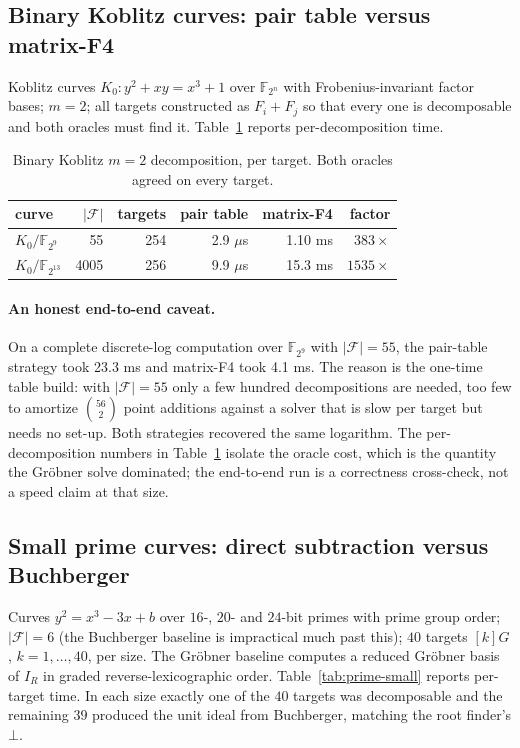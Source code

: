 \documentclass[10pt,a4paper]{article}
\theoremstyle{remark}
\newcommand{\FF}{\mathbb{F}}
\newcommand{\Fb}{\mathcal{F}}
\newcommand{\abs}[1]{\lvert #1 \rvert}
\begin{document}
\subsection{Binary Koblitz curves: pair table versus matrix-F4}
\label{sec:exp-binary}

Koblitz curves $K_0 : y^2 + xy = x^3 + 1$ over $\FF_{2^n}$ with
Frobenius-invariant factor bases; $m = 2$; all targets constructed as
$F_i + F_j$ so that every one is decomposable and both oracles must find
it. Table~\ref{tab:binary} reports per-decomposition time.

\begin{table}[h]
\centering
\caption{Binary Koblitz $m=2$ decomposition, per target. Both oracles
agreed on every target.}
\label{tab:binary}
\begin{tabular}{@{}lrrrrr@{}}
\toprule
curve & $\abs{\Fb}$ & targets & pair table & matrix-F4 & factor \\
\midrule
$K_0/\FF_{2^{9}}$  & 55   & 254 & 2.9 $\mu$s  & 1.10 ms & $383\times$ \\
$K_0/\FF_{2^{13}}$ & 4005 & 256 & 9.9 $\mu$s  & 15.3 ms & $1535\times$ \\
\bottomrule
\end{tabular}
\end{table}

\paragraph{An honest end-to-end caveat.} On a complete discrete-log
computation over $\FF_{2^9}$ with $\abs{\Fb} = 55$, the pair-table
strategy took 23.3 ms and matrix-F4 took 4.1 ms. The reason is the
one-time table build: with $\abs{\Fb} = 55$ only a few hundred
decompositions are needed, too few to amortize $\binom{56}{2}$ point
additions against a solver that is slow per target but needs no set-up.
Both strategies recovered the same logarithm. The per-decomposition
numbers in Table~\ref{tab:binary} isolate the oracle cost, which is the
quantity the Gr\"obner solve dominated; the end-to-end run is a
correctness cross-check, not a speed claim at that size.

\subsection{Small prime curves: direct subtraction versus Buchberger}
\label{sec:exp-prime-small}

Curves $y^2 = x^3 - 3x + b$ over $16$-, $20$- and $24$-bit primes with
prime group order; $\abs{\Fb} = 6$ (the Buchberger baseline is
impractical much past this); $40$ targets $[k]G$, $k = 1,\ldots,40$,
per size. The Gr\"obner baseline computes a reduced Gr\"obner basis of
$I_R$ in graded reverse-lexicographic order. Table~\ref{tab:prime-small}
reports per-target time. In each size exactly one of the $40$ targets
was decomposable and the remaining $39$ produced the unit ideal from
Buchberger, matching the root finder's $\bot$.
\end{document}
